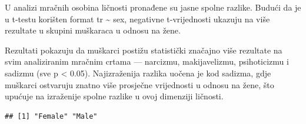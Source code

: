 \documentclass[
]{article}
\newenvironment{Shaded}{\begin{snugshade}}{\end{snugshade}}
\newcommand{\AttributeTok}[1]{\textcolor[rgb]{0.13,0.29,0.53}{#1}}
\newcommand{\FunctionTok}[1]{\textcolor[rgb]{0.13,0.29,0.53}{\textbf{#1}}}
\newcommand{\NormalTok}[1]{#1}
\newcommand{\OtherTok}[1]{\textcolor[rgb]{0.56,0.35,0.01}{#1}}
\newcommand{\SpecialCharTok}[1]{\textcolor[rgb]{0.81,0.36,0.00}{\textbf{#1}}}
\newcommand{\StringTok}[1]{\textcolor[rgb]{0.31,0.60,0.02}{#1}}
\begin{document}
U analizi mračnih osobina ličnosti pronađene su jasne spolne razlike.
Budući da je u t-testu korišten format tr \textasciitilde{} sex,
negativne t-vrijednosti ukazuju na više rezultate u skupini muškaraca u
odnosu na žene.

Rezultati pokazuju da muškarci postižu statistički značajno više
rezultate na svim analiziranim mračnim crtama --- narcizmu,
makijavelizmu, psihoticizmu i sadizmu (sve p \textless{} 0.05).
Najizraženija razlika uočena je kod sadizma, gdje muškarci ostvaruju
znatno više prosječne vrijednosti u odnosu na žene, što upućuje na
izraženije spolne razlike u ovoj dimenziji ličnosti.

\begin{Shaded}
\end{Shaded}

\begin{verbatim}
## [1] "Female" "Male"
\end{verbatim}
\end{document}
